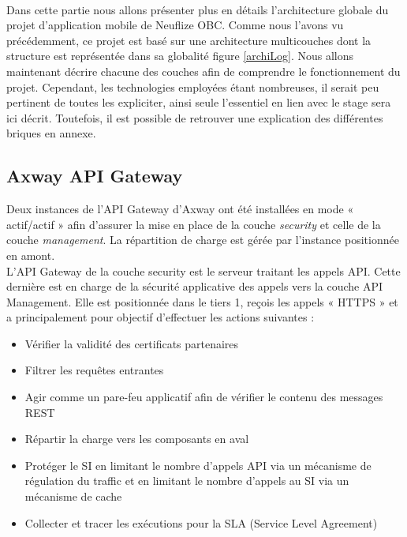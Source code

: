 \paragraph{}
Dans cette partie nous allons présenter plus en détails l'architecture globale du projet d'application mobile de Neuflize OBC. Comme nous l'avons vu précédemment, ce projet est basé sur une architecture multicouches dont la structure est représentée dans sa globalité figure \ref{archiLog}. Nous allons maintenant décrire chacune des couches afin de comprendre le fonctionnement du projet. Cependant, les technologies employées étant nombreuses, il serait peu pertinent de toutes les expliciter, ainsi seule l'essentiel en lien avec le stage sera ici décrit. Toutefois, il est possible de retrouver une explication des différentes briques en annexe.

\subsection{Axway API Gateway}
\label{axway}

	Deux instances de l'API Gateway d'Axway ont été installées en mode « actif/actif » afin d'assurer la mise en place de la couche \textit{security} et celle de la couche \textit{management}. La répartition de charge est gérée par l'instance positionnée en amont. \\
		
	L'API Gateway de la couche security est le serveur traitant les appels API. Cette dernière est en charge de la sécurité applicative des appels vers la couche API Management. Elle est positionnée dans le tiers 1, reçois les appels « HTTPS » et a principalement pour objectif d’effectuer les actions suivantes : \\
	
	\begin{itemize}
		\item Vérifier la validité des certificats partenaires
		\item Filtrer les requêtes entrantes 
		\item Agir comme un pare-feu applicatif afin de vérifier le contenu des messages REST
		\item Répartir la charge vers les composants en aval
		\item Protéger le SI en limitant le nombre d’appels API via un mécanisme de régulation du traffic et en limitant le nombre d'appels au SI via un mécanisme de cache
		\item Collecter et tracer les exécutions pour la SLA (Service Level Agreement) \\
	\end{itemize}
	
